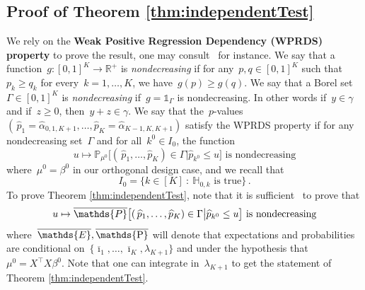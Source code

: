 \documentclass[final,numbib]{imaiai}%
\numberwithin{equation}{section}
\def\eq{\begin{equation}}
\def\qe{\end{equation}}
\def\bbE{\mathds{E}}
\def\bbP{\mathds{P}}
\def\bbR{\mathds{R}}
\renewcommand{\P}{\operatorname{\mathds{P}}}
\renewcommand{\bar}{\overline}
\renewcommand{\hat}{\widehat}
\newcommand{\<}{\langle}
\renewcommand{\>}{\rangle}
\newcommand{\1}{\mathds{1}}
\begin{document}
{\subsection{Proof of Theorem \ref{thm:independentTest}}
\label{proof:yoFDR}
We rely on the {\bf Weak Positive Regression Dependency (WPRDS) property} to prove the result, one may consult~\cite[Page 173]{giraud2014introduction} for instance. We say that a function~$g:[0,1]^K\to \bbR^+$ is {\it nondecreasing} if for any~$p,q\in[0,1]^K$ such that~$p_k\geq q_k$ for every~$k=1,\ldots, K$, we have~$g(p)\geq g(q)$. We say that a Borel set~$\Gamma\in[0,1]^K$ is {\it nondecreasing} if~$g=\mathds 1_\Gamma$ is nondecreasing. In other words  if~$y \in \gamma$ and if~$z\geq0$, then~$y+z \in \gamma$. We say that the~$p$-values~$(\,\hat p_1=\hat\alpha_{0,1,K+1},\ldots,\hat p_K=\hat\alpha_{K-1,K,K+1})$ satisfy the WPRDS property if for any nondecreasing set~$\Gamma$ %
 and for all~$k^0\in I_0$, the function 
\[
u\mapsto \bbP_{\mu^0}\big[(\,\hat p_1,\ldots,\hat p_K)\in\Gamma\big|\hat p_{k^0}\leq u\big]\text{ is nondecreasing}
\]
where~$\mu^0=\beta^0$ in our  orthogonal design case, and we recall that
\[
I_0=\big\{k\in[K]\ :\ \mathds H_{0,k}\text{ is true}\big\}\,.
\] 
To prove Theorem \ref{thm:independentTest}, note that it is sufficient~\cite[Chapter~8]{giraud2014introduction} to prove that 
\eq
\label{yoyonondecresaing}
u\mapsto \overline\bbP\big[(\,\hat p_1,\ldots,\hat p_K)\in\Gamma\big|\hat p_{k^0}\leq u\big]\text{ is nondecreasing}
\qe
where~$\bar\bbE,\overline{\P}$ will denote that expectations and probabilities are conditional on~$\{\bar \imath_1,\ldots, \bar \imath_K,\lambda_{K+1}\}$ and under the hypothesis that~$\mu^0=X^\top X\beta^0$. Note that one can integrate in~$\lambda_{K+1}$ to get the statement of Theorem \ref{thm:independentTest}.

\medskip

}
\end{document}
